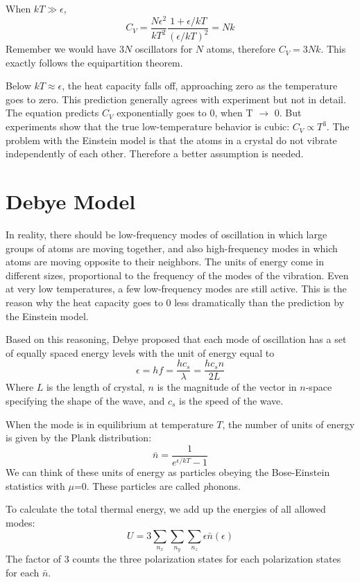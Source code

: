 When $kT \gg \epsilon$,
\begin{equation}
C_V = \frac{N\epsilon^2}{kT^2} \frac{1+ \epsilon/kT} {(\epsilon/kT)^2} = Nk
\end{equation}
Remember we would have 3$N$ oscillators for $N$ atoms, therefore $C_V = 3Nk$.
This exactly follows the equipartition theorem. 

Below $kT \approx \epsilon$, the heat capacity falls off, approaching zero as the temperature goes to zero. This prediction generally agrees with experiment but not in detail. The equation predicts $C_V$ exponentially goes to 0, when T $\rightarrow$ 0. But experiments show that the true low-temperature behavior is cubic: $C_V \propto T^3$. The problem with the Einstein model is that the atoms in a crystal do not vibrate independently of each other. Therefore a better assumption is needed.

\section{Debye Model}
In reality, there should be low-frequency modes of oscillation in which large groups of atoms are moving together, and also high-frequency modes in which atoms are moving opposite to their neighbors.
The units of energy come in different sizes, proportional to the frequency of the modes of the vibration. Even at very low temperatures, a few low-frequency modes are still active. 
This is the reason why the heat capacity goes to 0 less dramatically than the prediction by the Einstein model.

Based on this reasoning, Debye proposed that each mode of oscillation has a set of equally spaced energy levels with the unit of energy equal to
\begin{equation}
\epsilon = hf = \frac{hc_s}{\lambda}=\frac{hc_sn}{2L}
\end{equation}
Where $L$ is the length of crystal, $n$ is the magnitude of the vector in $n$-space specifying the shape of the wave, and $c_s$ is the speed of the wave.

When the mode is in equilibrium at temperature $T$, the number of units of energy is given by the Plank distribution:
\begin{equation} 
\bar{n} = \frac{1}{e^{\epsilon/kT}-1}
\end{equation} 
We can think of these units of energy as particles obeying the Bose-Einstein statistics with $\mu$=0. These particles are called {\emph phonons}.

To calculate the total thermal energy, we add up the energies of all allowed modes:
\begin{equation}
U = 3\sum_{n_x}\sum_{n_y}\sum_{n_z} \epsilon \bar{n}(\epsilon)
\end{equation}
The factor of 3 counts the three polarization states for each polarization states for each $\bar{n}$.

